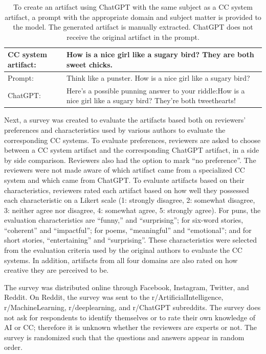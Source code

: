 \documentclass[phd,electronic,oneside,twosidetoc,letterpaper,chaptercenter,parttop,lof]{byumsphd}
\begin{document}
\begin{table}[t]
\centering
\begin{tabular}{|M{4cm}| M{11cm}|}
\hline
CC system artifact: & How is a nice girl like a sugary bird? They are both sweet chicks. \\
\hline
Prompt:          & Think like a punster. How is a nice girl like a sugary bird?  \\
\hline
ChatGPT: & Here's a possible punning answer to your riddle:\newline How is a nice girl like a sugary bird? \newline They're both tweethearts! \\
\hline
\end{tabular}
\caption{To create an artifact using ChatGPT with the same subject as a CC system artifact, a prompt with the appropriate domain and subject matter is provided to the model. The generated artifact is manually extracted. ChatGPT does not receive the original artifact in the prompt.}
\label{tab:example-prompt}
\end{table}

Next, a survey was created to evaluate the artifacts based both on reviewers' preferences and characteristics used by various authors to evaluate the corresponding CC systems. 
To evaluate preferences, reviewers are asked to choose between a CC system artifact and the corresponding ChatGPT artifact, in a side by side comparison. 
Reviewers also had the option to mark ``no preference''.
The reviewers were not made aware of which artifact came from a specialized CC system and which came from ChatGPT. 
To evaluate artifacts based on their characteristics, reviewers rated each artifact based on how well they possessed each characteristic on a Likert scale (1: strongly disagree, 2: somewhat disagree, 3: neither agree nor disagree, 4: somewhat agree, 5: strongly agree). For puns, the evaluation characteristics are ``funny,'' and ``surprising''; for six-word stories, ``coherent'' and ``impactful''; for poems, ``meaningful'' and ``emotional''; and for short stories, ``entertaining'' and ``surprising''.
These characteristics were selected from the evaluation criteria used by the original authors to evaluate the CC systems.  In addition, artifacts from all four domains are also rated on how creative they are perceived to be.

The survey was distributed online through Facebook, Instagram, Twitter, and Reddit.
On Reddit, the survey was sent to the r/ArtificialIntelligence, r/MachineLearning, r/deeplearning, and r/ChatGPT subreddits.
The survey does not ask for respondents to identify themselves or to rate their own knowledge of AI or CC; therefore it is unknown whether the reviewers are experts or not.
The survey is randomized such that the questions and answers appear in random order.
\end{document}
